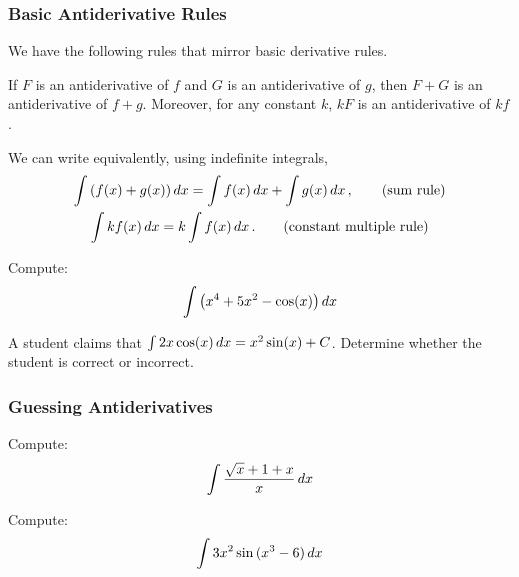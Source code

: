 \documentclass[10pt,t,handout,ignorenonframetext,aspectratio=169]{beamer}
\begin{document}
\begin{frame}
  \frametitle{Basic Antiderivative Rules}
  We have the following rules that mirror basic derivative rules.
  \begin{thm}
    If $F$ is an antiderivative of $f$ and $G$ is an antiderivative of
    $g$, then $F+G$ is an antiderivative of $f+g$. Moreover, for any
    constant $k$, $kF$ is an antiderivative of $kf$.

    We can write equivalently, using indefinite integrals,
    \begin{gather}
      \int \left(f(x)+g(x)\right) \mathop{}\!d x
      = \int f(x)\mathop{}\!d x +\int g(x) \mathop{}\!d x \,, \tag{sum rule}\\
      \int kf(x) \mathop{}\!d x= k\int f(x)\mathop{}\!d x \,. \tag{constant multiple rule}
    \end{gather}
  \end{thm}

\end{frame}

\begin{frame}
  \vs

  \begin{question}
    Compute:
    \[
      \int \left(x^4 + 5x^2 - \cos(x)\right) \mathop{}\!d x
    \]
  \end{question}

\end{frame}

\begin{frame}
  \vs
  \begin{question}
    A student claims that $\int 2x \cos(x) \mathop{}\!d x = x^2 \sin(x) +C$.  Determine whether the student is correct or incorrect.
  \end{question}


\end{frame}

\begin{frame}
  \frametitle{Guessing Antiderivatives}
  \begin{question}
    Compute:
    \[
      \int \frac{\sqrt{x}+1+x}{x} \mathop{}\!d x
    \]
  \end{question}

\end{frame}


\begin{frame}
  \vs
  \begin{question}
    Compute:
    \[
      \int 3x^2\sin{(x^3 -6)} \mathop{}\!d x
    \]
  \end{question}


\end{frame}
\end{document}
